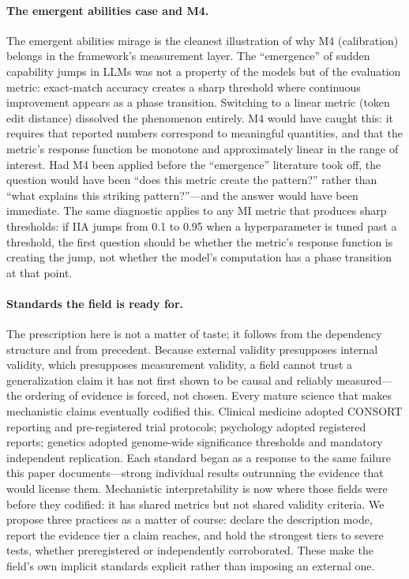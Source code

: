 \documentclass{article}
\begin{document}
\paragraph{The emergent abilities case and M4.}
The \citet{schaeffer2024emergent} emergent abilities mirage is the cleanest illustration of why M4 (calibration) belongs in the framework's measurement layer. The ``emergence'' of sudden capability jumps in LLMs was not a property of the models but of the evaluation metric: exact-match accuracy creates a sharp threshold where continuous improvement appears as a phase transition. Switching to a linear metric (token edit distance) dissolved the phenomenon entirely. M4 would have caught this: it requires that reported numbers correspond to meaningful quantities, and that the metric's response function be monotone and approximately linear in the range of interest. Had M4 been applied before the ``emergence'' literature took off, the question would have been ``does this metric create the pattern?'' rather than ``what explains this striking pattern?''---and the answer would have been immediate. The same diagnostic applies to any MI metric that produces sharp thresholds: if IIA jumps from 0.1 to 0.95 when a hyperparameter is tuned past a threshold, the first question should be whether the metric's response function is creating the jump, not whether the model's computation has a phase transition at that point.

\paragraph{Standards the field is ready for.}
The prescription here is not a matter of taste; it follows from the dependency structure and from precedent. Because external validity presupposes internal validity, which presupposes measurement validity, a field cannot trust a generalization claim it has not first shown to be causal and reliably measured---the ordering of evidence is forced, not chosen. Every mature science that makes mechanistic claims eventually codified this. Clinical medicine adopted CONSORT reporting and pre-registered trial protocols; psychology adopted registered reports; genetics adopted genome-wide significance thresholds and mandatory independent replication. Each standard began as a response to the same failure this paper documents---strong individual results outrunning the evidence that would license them. Mechanistic interpretability is now where those fields were before they codified: it has shared metrics but not shared validity criteria. We propose three practices as a matter of course: declare the description mode, report the evidence tier a claim reaches, and hold the strongest tiers to severe tests, whether preregistered or independently corroborated. These make the field's own implicit standards explicit rather than imposing an external one.
\end{document}
